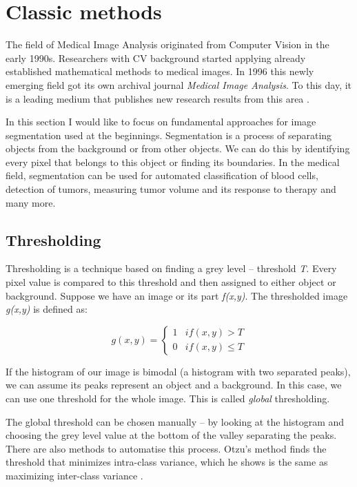 \section{Classic methods}
The field of Medical Image Analysis originated from Computer Vision in the early 1990s. Researchers with CV background started applying already established mathematical methods to medical images. In 1996 this newly emerging field got its own archival journal \textit{Medical Image Analysis}. To this day, it is a leading medium that publishes new research results from this area \cite{wells2016}.

In this section I would like to focus on fundamental approaches for image segmentation used at the beginnings. Segmentation is a process of separating objects from the background or from other objects. We can do this by identifying every pixel that belongs to this object or finding its boundaries. In the medical field, segmentation can be used for automated classification of blood cells, detection of tumors, measuring tumor volume and its response to therapy and many more.

\subsection{Thresholding}
Thresholding \cite{thresholding} is a technique based on finding a grey level -- threshold \textit{T}. Every pixel value is compared to this threshold and then assigned to either object or background. Suppose we have an image or its part \textit{f(x,y)}. The thresholded image \textit{g(x,y)} is defined as:

\begin{equation}
    g(x,y) = 
    \left\{\begin{matrix}
    1  &  if (x,y) > T \\ 
    0  &  if (x,y) \leq T
    \end{matrix}\right.
\end{equation}

If the histogram of our image is bimodal (a histogram with two separated peaks), we can assume its peaks represent an object and a background. In this case, we can use one threshold for the whole image. This is called \textit{global} thresholding. 

The global threshold can be chosen manually -- by looking at the histogram and choosing the grey level value at the bottom of the valley separating the peaks. There are also methods to automatise this process. Otzu's method finds the threshold that minimizes intra-class variance, which he shows is the same as maximizing inter-class variance \cite{otzu1979}.  


